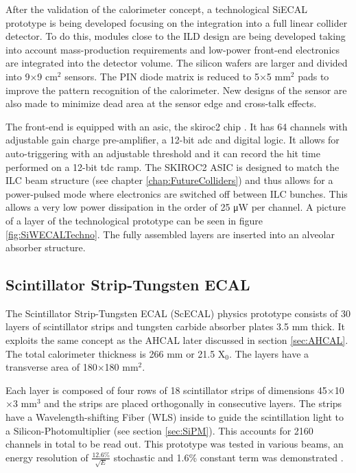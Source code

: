 After the validation of the calorimeter concept, a technological SiECAL prototype is being developed focusing on the integration into a full linear collider detector. To do this, modules close to the ILD design are being developed taking into account mass-production requirements and low-power front-end electronics are integrated into the detector volume. The silicon wafers are larger and divided into 9$\times$9 cm$^2$ sensors. The PIN diode matrix is reduced to 5$\times$5 mm$^2$ pads to improve the pattern recognition of the calorimeter. New designs of the sensor are also made to minimize dead area at the sensor edge and cross-talk effects.

The front-end is equipped with an \acrshort{asic}, the \acrshort{skiroc2} chip \cite{1748-0221-6-12-C12040}. It has 64 channels with adjustable gain charge pre-amplifier, a 12-bit \acrshort{adc} and digital logic. It allows for auto-triggering with an adjustable threshold and it can record the hit time performed on a 12-bit \acrshort{tdc} ramp. The SKIROC2 ASIC is designed to match the ILC beam structure (see chapter \ref{chap:FutureColliders}) and thus allows for a power-pulsed mode where electronics are switched off between ILC bunches. This allows a very low power dissipation in the order of 25 \si{\micro\watt} per channel. A picture of a layer of the technological prototype can be seen in figure \ref{fig:SiWECALTechno}. The fully assembled layers are inserted into an alveolar absorber structure.

\subsection{Scintillator Strip-Tungsten ECAL}
\label{subsec:ScECAL}

The Scintillator Strip-Tungsten ECAL (ScECAL) physics prototype \cite{1707.07126v2} consists of 30 layers of scintillator strips and tungsten carbide absorber plates 3.5 mm thick. It exploits the same concept as the AHCAL later discussed in section \ref{sec:AHCAL}. The total calorimeter thickness is 266 mm or 21.5 X$_0$. The layers have a transverse area of 180$\times$180 mm$^2$.

Each layer is composed of four rows of 18 scintillator strips of dimensions 45$\times$10$\times$3 mm$^3$ and the strips are placed orthogonally in consecutive layers. The strips have a Wavelength-shifting Fiber (WLS) inside to guide the scintillation light to a Silicon-Photomultiplier (see section \ref{sec:SiPM}). This accounts for 2160 channels in total to be read out. This prototype was tested in various beams, an energy resolution of $\frac{12.6\%}{\sqrt{E}}$ stochastic and 1.6\% constant term was demonstrated \cite{1707.07126v2}.

